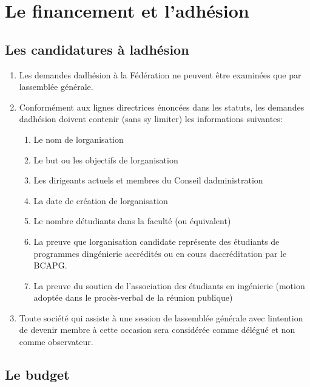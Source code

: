 \section{Le financement et l'adhésion}
\label{le-financement-et-l-adhesion}

\subsection{Les candidatures à l\textquotesingle adhésion}
\label{les-candidatures-a-l-adhesion}

\begin{enumerate}
 \item
  Les demandes d\textquotesingle adhésion à la Fédération ne peuvent être examinées que par l\textquotesingle assemblée générale.
 \item
  Conformément aux lignes directrices énoncées dans les statuts, les demandes d\textquotesingle adhésion doivent contenir (sans s\textquotesingle y limiter) les informations suivantes:

  \begin{enumerate}
   \item
    Le nom de l\textquotesingle organisation
   \item
    Le but ou les objectifs de l\textquotesingle organisation
   \item
    Les dirigeants actuels et membres du Conseil d\textquotesingle administration
   \item
    La date de création de l\textquotesingle organisation
   \item
    Le nombre d\textquotesingle étudiants dans la faculté (ou équivalent)
   \item
    La preuve que l\textquotesingle organisation candidate représente des étudiants de programmes d\textquotesingle ingénierie accrédités ou en cours d\textquotesingle accréditation par le BCAPG.
   \item
    La preuve du soutien de l'association des étudiants en ingénierie (motion adoptée dans le procès-verbal de la réunion publique)
  \end{enumerate}
 \item
  Toute société qui assiste à une session de l\textquotesingle assemblée générale avec l\textquotesingle intention de devenir membre à cette occasion sera considérée comme délégué et non comme observateur.
\end{enumerate}

\subsection{Le budget}
\label{le-budget}


